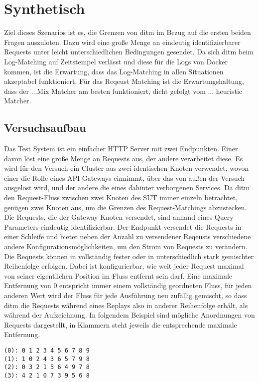 \documentclass[a4paper]{report}
\begin{document}
\section{Synthetisch}
Ziel dieses Szenarios ist es, die Grenzen von ditm im Bezug auf die ersten beiden Fragen auszuloten.
Dazu wird eine große Menge an eindeutig identifizierbarer Requests unter leicht unterschiedlichen Bedingungen gesendet.
Da sich ditm beim Log-Matching auf Zeitstempel verlässt und diese für die Logs von Docker kommen, ist die Erwartung,
dass das Log-Matching in allen Situationen akzeptabel funktioniert. Für das Reqeust Matching ist die Erwartungshaltung, dass
der ...Mix Matcher am besten funktioniert, dicht gefolgt vom ... heuristic Matcher.
\subsection{Versuchsaufbau}
Das Test System ist ein einfacher HTTP Server mit zwei Endpunkten. Einer davon löst
eine große Menge an Requests aus, der andere verarbeitet diese. Es wird für den Versuch ein Cluster aus zwei identischen
Knoten verwendet, wovon einer die Rolle eines API Gateways einnimmt, über das von außen der Versuch ausgelöst wird,
und der andere die eines dahinter verborgenen Services. Da ditm den Request-Fluss zwischen zwei Knoten des SUT immer einzeln
betrachtet, genügen zwei Knoten aus, um die Grenzen des Request-Matchings abzustecken.
Die Requests, die der Gateway Knoten versendet, sind anhand eines Query Parameters eindeutig identifizierbar.
Der Endpunkt versendet die Requests in einer Schleife und bietet neben der Anzahl zu versendener Reqeusts verschiedene
andere Konfigurationsmöglichkeiten, um den Strom von Requests zu verändern.
Die Requests können in vollständig fester oder in unterschiedlich stark gemischter Reihenfolge erfolgen. Dabei ist konfigurierbar,
wie weit jeder Request maximal von seiner eigentlichen Position im Fluss entfernt sein darf. Eine maximale Entfernung
von 0 entspricht immer einem vollständig geordneten Fluss, für jeden anderen Wert wird der Fluss für jede Ausführung neu
zufällig gemischt, so dass ditm die Requests während eines Replays also in anderer Reihenfolge erhält, als während der
Aufzeichnung. In folgendem Beispiel sind mögliche Anordnungen von Requests dargestellt, in Klammern steht jeweils die
entsprechende maximale Entfernung.
\begin{verbatim}
(0): 0 1 2 3 4 5 6 7 8 9
(1): 1 0 2 4 3 6 5 7 9 8
(2): 0 3 2 1 5 6 4 9 7 8
(3): 4 2 1 0 7 3 9 5 6 8
\end{verbatim}
\end{document}
